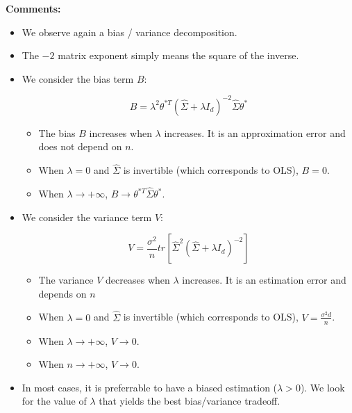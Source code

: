 \documentclass[
10pt, %
a4paper, %
oneside, %
headinclude,footinclude, %
BCOR5mm, %
]{scrartcl}
\begin{document}
\textbf{{Comments:}} 
\begin{itemize}
    \item We observe again a bias / variance decomposition.
    
    \item The $-2$ matrix exponent simply means the square of the inverse.
    \item We consider the bias term $B$:

        \begin{equation}
           B =  \lambda^2\theta^{*T} ( \hat{\Sigma}+\lambda I_d)^{-2} \hat{\Sigma} \theta^*
        \end{equation}
        \begin{itemize}
            \item The bias $B$ increases when $\lambda$ increases. It is an approximation error and does not depend on $n$.
            \item When $\lambda = 0$ and $ \hat{\Sigma}$ is invertible (which corresponds to OLS), $B=0$. 
            \item When $\lambda \rightarrow +\infty$, $B\rightarrow \theta^{*T} \hat{\Sigma}\theta^*$. 
        \end{itemize}

    \item We consider the variance term $V$:

        \begin{equation}
            V=\frac{\sigma^2}{n} tr[ \hat{\Sigma}^2( \hat{\Sigma}+\lambda I_d)^{-2} ]
        \end{equation}
        \begin{itemize}
            \item The variance $V$ decreases when $\lambda$ increases. It is an estimation error and depends on $n$
            \item When $\lambda = 0$ and $ \hat{\Sigma}$ is invertible (which corresponds to OLS), $V= \frac{\sigma^2d}{n} $.
            \item When $\lambda\rightarrow +\infty$, $V\rightarrow 0$. 
            \item When $n\rightarrow +\infty$, $V\rightarrow 0$. 
        \end{itemize}

    \item In most cases, it is preferrable to have a biased estimation ($\lambda >0$). We look for the value of $\lambda$ that yields the best bias/variance tradeoff.
\end{itemize}
\end{document}
